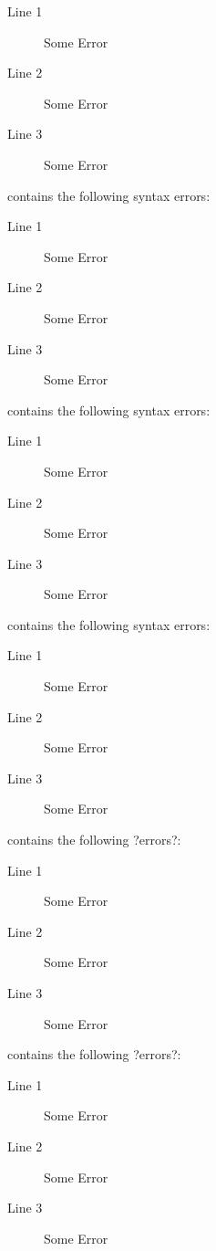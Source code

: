\documentclass{article}
\begin{document}
\begin{description}
\begin{description}
			\begin{description}
		  	   \item[Line 1] Some Error
		  	   \item[Line 2] Some Error
		 	   \item[Line 3] Some Error
			\end{description}
		\item[5.pal] contains the following syntax errors:
			\begin{description}
		  	   \item[Line 1] Some Error
		  	   \item[Line 2] Some Error
		 	   \item[Line 3] Some Error
			\end{description}
		\item[6.pal] contains the following syntax errors:
			\begin{description}
		  	   \item[Line 1] Some Error
		  	   \item[Line 2] Some Error
		 	   \item[Line 3] Some Error
			\end{description}
		\item[7.pal] contains the following syntax errors:
			\begin{description}
		  	   \item[Line 1] Some Error
		  	   \item[Line 2] Some Error
		 	   \item[Line 3] Some Error
			\end{description}
		\item[8.pal] contains the following ?errors?:
			\begin{description}
		  	   \item[Line 1] Some Error
		  	   \item[Line 2] Some Error
		 	   \item[Line 3] Some Error
			\end{description}
		\item[9.pal] contains the following ?errors?:
			\begin{description}
		  	   \item[Line 1] Some Error
		  	   \item[Line 2] Some Error
		 	   \item[Line 3] Some Error
			\end{description}

		\end{description}	
\end{description}
\end{document}
